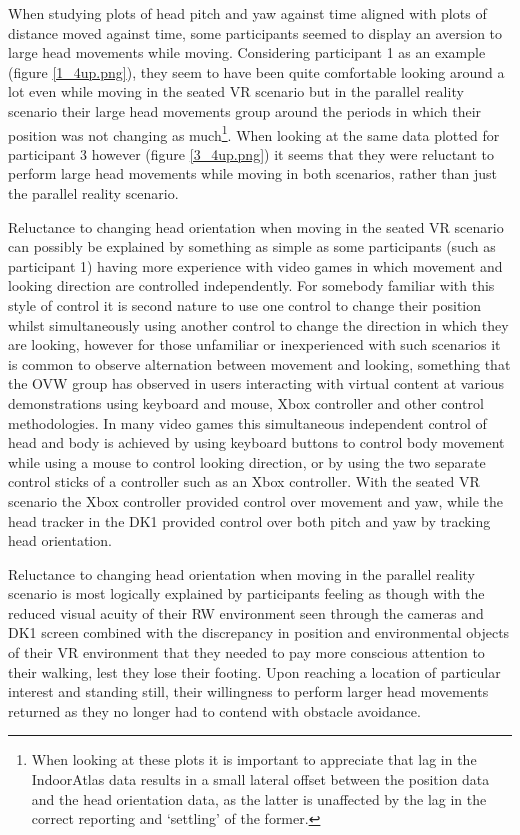 
When studying plots of head pitch and yaw against time aligned with plots of distance moved against time, some participants seemed to display an aversion to large head movements while moving. Considering participant 1 as an example (figure \ref{1_4up.png}), they seem to have been quite comfortable looking around a lot even while moving in the seated VR scenario but in the parallel reality scenario their large head movements group around the periods in which their position was not changing as much\footnote{When looking at these plots it is important to appreciate that lag in the IndoorAtlas data results in a small lateral offset between the position data and the head orientation data, as the latter is unaffected by the lag in the correct reporting and `settling' of the former.}. When looking at the same data plotted for participant 3 however (figure \ref{3_4up.png}) it seems that they were reluctant to perform large head movements while moving in both scenarios, rather than just the parallel reality scenario.

Reluctance to changing head orientation when moving in the seated VR scenario can possibly be explained by something as simple as some participants (such as participant 1) having more experience with video games in which movement and looking direction are controlled independently. For somebody familiar with this style of control it is second nature to use one control to change their position whilst simultaneously using another control to change the direction in which they are looking, however for those unfamiliar or inexperienced with such scenarios it is common to observe alternation between movement and looking, something that the OVW group has observed in users interacting with virtual content at various demonstrations using keyboard and mouse, Xbox controller and other control methodologies. In many video games this simultaneous independent control of head and body is achieved by using keyboard buttons to control body movement while using a mouse to control looking direction, or by using the two separate control sticks of a controller such as an Xbox controller. With the seated VR scenario the Xbox controller provided control over movement and yaw, while the head tracker in the DK1 provided control over both pitch and yaw by tracking head orientation.

Reluctance to changing head orientation when moving in the parallel reality scenario is most logically explained by participants feeling as though with the reduced visual acuity of their RW environment seen through the cameras and DK1 screen combined with the discrepancy in position and environmental objects of their VR environment that they needed to pay more conscious attention to their walking, lest they lose their footing. Upon reaching a location of particular interest and standing still, their willingness to perform larger head movements returned as they no longer had to contend with obstacle avoidance.

